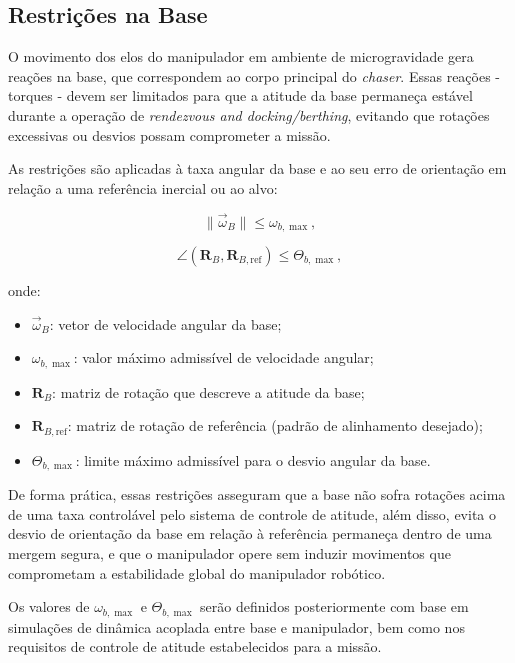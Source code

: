 \subsection{Restrições na Base}

O movimento dos elos do manipulador em ambiente de microgravidade gera reações na base, que correspondem ao corpo principal do \emph{chaser}.  
Essas reações - torques - devem ser limitados para que a atitude da base permaneça estável durante a operação de \emph{rendezvous and docking/berthing}, evitando que rotações excessivas ou desvios possam comprometer a missão.

As restrições são aplicadas à taxa angular da base e ao seu erro de orientação em relação a uma referência inercial ou ao alvo:

\begin{equation}
\label{eq:restr_base_w}
\|\vec{\omega}_B\| \leq \omega_{b,\max},
\end{equation}

\begin{equation}
\label{eq:restr_base_theta}
\angle(\mathbf{R}_B, \mathbf{R}_{B,\text{ref}}) \leq \Theta_{b,\max},
\end{equation}

onde:
\begin{itemize}
    \item $\vec{\omega}_B$: vetor de velocidade angular da base;
    \item $\omega_{b,\max}$: valor máximo admissível de velocidade angular;
    \item $\mathbf{R}_B$: matriz de rotação que descreve a atitude da base;
    \item $\mathbf{R}_{B,\text{ref}}$: matriz de rotação de referência (padrão de alinhamento desejado);
    \item $\Theta_{b,\max}$: limite máximo admissível para o desvio angular da base.
\end{itemize}

De forma prática, essas restrições asseguram que a base não sofra rotações acima de uma taxa controlável pelo sistema de controle de atitude, além disso, evita o desvio de orientação da base em relação à referência permaneça dentro de uma mergem segura, e que o manipulador opere sem induzir movimentos que comprometam a estabilidade global do manipulador robótico.

Os valores de $\omega_{b,\max}$ e $\Theta_{b,\max}$ serão definidos posteriormente com base em simulações de dinâmica acoplada entre base e manipulador, bem como nos requisitos de controle de atitude estabelecidos para a missão.

